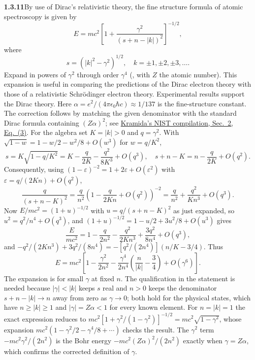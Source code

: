 \par\bigskip
\noindent\textbf{1.3.11}\quad By use of Dirac's relativistic theory, the fine
structure formula of atomic spectroscopy is given by
\[
E=mc^{2}\left[1+\frac{\gamma^{2}}{(s+n-|k|)^{2}}\right]^{-1/2},
\]
where
\[
s=(|k|^{2}-\gamma^{2})^{1/2},\quad k=\pm1,\pm2,\pm3,\ldots.
\]
 Expand in powers of $\gamma^{2}$ through order $\gamma^{4}$
(, with $Z$ the atomic number).
This expansion is useful in comparing the predictions of the Dirac electron
theory with those of a relativistic Schr\"odinger electron theory.
Experimental results support the Dirac theory.
\solution
{}
Here $\alpha=e^2/(4\pi\epsilon_0\hbar c)\approx1/137$ is the
fine-structure constant. The correction follows by matching the given
denominator with the standard Dirac formula containing $(Z\alpha)^2$; see
\href{https://tsapps.nist.gov/publication/get_pdf.cfm?pub_id=842564}
{Kramida's NIST compilation, Sec.~2, Eq.~(3)}.
For the algebra set $K=|k|>0$ and $q=\gamma^2$. With
$\sqrt{1-w}=1-w/2-w^2/8+O(w^3)$ for $w=q/K^2$,
\[
 s=K\sqrt{1-q/K^2}=K-\frac q{2K}-\frac{q^2}{8K^3}+O(q^3),
 \quad s+n-K=n-\frac q{2K}+O(q^2).
\]
Consequently, using $(1-\varepsilon)^{-2}=1+2\varepsilon+O(\varepsilon^2)$
with $\varepsilon=q/(2Kn)+O(q^2)$,
\[
 \frac{q}{(s+n-K)^2}
 =\frac q{n^2}\left(1-\frac q{2Kn}+O(q^2)\right)^{-2}
 =\frac q{n^2}+\frac{q^2}{Kn^3}+O(q^3).
\]
Now $E/mc^2=(1+u)^{-1/2}$ with $u=q/(s+n-K)^2$ as just expanded, so
$u^2=q^2/n^4+O(q^3)$, and $(1+u)^{-1/2}=1-u/2+3u^2/8+O(u^3)$ gives
\[
 \frac E{mc^2}=1-\frac q{2n^2}-\frac{q^2}{2Kn^3}+\frac{3q^2}{8n^4}+O(q^3),
\]
and $-q^2/(2Kn^3)+3q^2/(8n^4)=-[q^2/(2n^4)](n/K-3/4)$. Thus
\[
 \boxed{E=mc^2\left[1-\frac{\gamma^2}{2n^2}
 -\frac{\gamma^4}{2n^4}\left(\frac n{|k|}-\frac34\right)
 +O(\gamma^6)\right]}.
\]
The expansion is for small $\gamma$ at fixed $n$. The qualification in
the statement is needed because $|\gamma|<|k|$ keeps $s$ real and $n>0$
keeps the denominator $s+n-|k|\to n$ away from zero as $\gamma\to0$;
both hold for the physical states, which have $n\ge|k|\ge1$ and
$|\gamma|=Z\alpha<1$ for every known element. For $n=|k|=1$ the exact
expression reduces to
$mc^2[1+\gamma^2/(1-\gamma^2)]^{-1/2}=mc^2\sqrt{1-\gamma^2}$, whose expansion
$mc^2(1-\gamma^2/2-\gamma^4/8+\cdots)$ checks the result.
The $\gamma^2$ term $-mc^2\gamma^2/(2n^2)$ is the Bohr energy
$-mc^2(Z\alpha)^2/(2n^2)$ exactly when $\gamma=Z\alpha$, which confirms
the corrected definition of $\gamma$.


